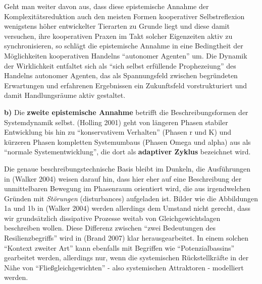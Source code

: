 \documentclass[11pt,a4paper]{article}
\begin{document}
Geht man weiter davon aus, dass diese epistemische Annahme der
Komplexitätsreduktion auch den meisten Formen kooperativer
Selbstreflexion wenigstens höher entwickelter Tierarten zu Grunde liegt
und diese damit versuchen, ihre kooperativen Praxen im Takt solcher
Eigenzeiten aktiv zu synchronisieren, so schlägt die epistemische
Annahme in eine Bedingtheit der Möglichkeiten kooperativen Handelns
``autonomer Agenten'' um. Die Dynamik der Wirklichkeit entfaltet sich
als ``sich selbst erfüllende Prophezeiung'' des Handelns autonomer
Agenten, das als Spannungsfeld zwischen begründeten Erwartungen und
erfahrenen Ergebnissen ein Zukunftsfeld vorstrukturiert und damit
Handlungsräume aktiv gestaltet.

\textbf{b)} Die \textbf{zweite epistemische Annahme} betrifft die
Beschreibungsformen der Systemdynamik selbst. (Holling 2001) geht von
längeren Phasen stabiler Entwicklung bis hin zu ``konservativem
Verhalten'' (Phasen r und K) und kürzeren Phasen kompletten Systemumbaus
(Phasen Omega und alpha) aus als ``normale Systementwicklung'', die dort
als \textbf{adaptiver Zyklus} bezeichnet wird.

Die genaue beschreibungstechnische Basis bleibt im Dunkeln, die
Ausführungen in (Walker 2004) weisen darauf hin, dass hier eher auf eine
Beschreibung der unmittelbaren Bewegung im Phasenraum orientiert wird,
die aus irgendwelchen Gründen mit \emph{Störungen} (disturbances)
aufgeladen ist. Bilder wie die Abbildungen 1a und 1b in (Walker 2004)
werden allerdings dem Umstand nicht gerecht, dass wir grundsätzlich
dissipative Prozesse weitab von Gleichgewichtslagen beschreiben wollen.
Diese Differenz zwischen ``zwei Bedeutungen des Resilienzbegriffs'' wird
in (Brand 2007) klar herausgearbeitet. In einem solchen ``Kontext
zweiter Art'' kann ebenfalls mit Begriffen wie ``Potenzialbassins''
gearbeitet werden, allerdings nur, wenn die systemischen Rückstellkräfte
in der Nähe von ``Fließgleichgewichten'' - also systemischen Attraktoren
- modelliert werden.
\end{document}
